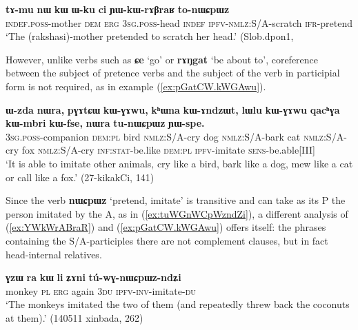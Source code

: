 \documentclass[oneside,a4paper,11pt]{article}
\newcommand{\ipa}[1]{\textbf{\phon#1}} %
\newcommand{\jpg}[2]{\ipa{#1} `#2'} %
\begin{document}
\begin{exe}
\ex \label{ex:YWkWrABraR}
\gll \ipa{tɤ-mu} 	\ipa{nɯ} 	\ipa{kɯ} 	\ipa{ɯ-ku} 	\ipa{ci} 	\ipa{ɲɯ-kɯ-rɤβraʁ} 	\ipa{to-nɯɕpɯz} \\
\textsc{indef.poss}-mother \textsc{dem} \textsc{erg} \textsc{3sg.poss}-head \textsc{indef} \textsc{ipfv-nmlz}:S/A-scratch \textsc{ifr}-pretend \\
\glt `The (rakshasi)-mother pretended to scratch her head.' (Slob.dpon1, 
\end{exe}

However, unlike verbs such as \jpg{ɕe}{go} or \jpg{rɤŋgat}{be about to},  coreference between the subject of pretence verbs and the subject of the verb in participial form is not required, as in example (\ref{ex:pGatCW.kWGAwu}).

\begin{exe}
\ex \label{ex:pGatCW.kWGAwu}
\gll  \ipa{ɯ-zda} 	\ipa{nɯra,} 	\ipa{pɣɤtɕɯ} 	\ipa{kɯ-ɣɤwu,} 	\ipa{kʰɯna} 	\ipa{kɯ-ɤndzɯt,} 	\ipa{lɯlu} 	\ipa{kɯ-ɣɤwu} 	\ipa{qacʰɣa} 	\ipa{kɯ-mbri} 	\ipa{kɯ-fse,} 	\ipa{nɯra} 	\ipa{tu-nɯɕpɯz} 	\ipa{ɲɯ-spe.} \\
\textsc{3sg.poss}-companion \textsc{dem:pl} bird \textsc{nmlz}:S/A-cry dog \textsc{nmlz}:S/A-bark cat \textsc{nmlz}:S/A-cry fox \textsc{nmlz}:S/A-cry \textsc{inf:stat}-be.like \textsc{dem:pl} \textsc{ipfv}-imitate \textsc{sens}-be.able[III] \\
\glt `It is able to imitate other animals, cry like a bird, bark like a dog, mew like a cat or call like a fox.' (27-kikakCi, 141)
\end{exe}

Since the verb \jpg{nɯɕpɯz}{pretend, imitate} is transitive and can take as its P the person imitated by the A, as in (\ref{ex:tuWGnWCpWzndZi}), a different analysis of (\ref{ex:YWkWrABraR}) and (\ref{ex:pGatCW.kWGAwu}) offers itself: the phrases containing the S/A-participles there are not complement clauses, but in fact head-internal relatives.

\begin{exe}
\ex \label{ex:tuWGnWCpWzndZi}
\gll \ipa{ɣzɯ} 	\ipa{ra} 	\ipa{kɯ} 	\ipa{li} 	\ipa{ʑɤni} 	\ipa{tú-wɣ-nɯɕpɯz-ndʑi} \\
monkey \textsc{pl} \textsc{erg} again \textsc{3du} \textsc{ipfv-inv}-imitate-\textsc{du} \\
\glt `The monkeys imitated the two of them (and repeatedly threw back the coconuts at them).' (140511 xinbada, 262)
\end{exe} 
\end{document}
